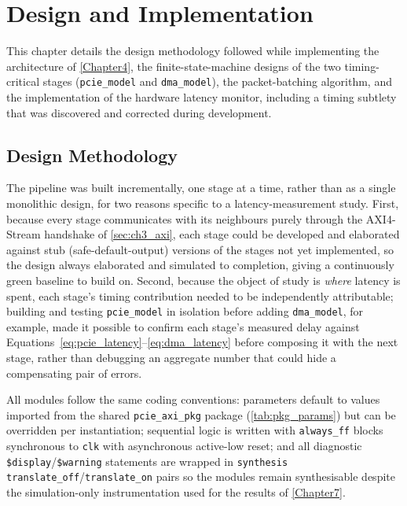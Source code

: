 
\chapter{Design and Implementation}

\label{Chapter5}


This chapter details the design methodology followed while implementing the architecture of \autoref{Chapter4}, the finite-state-machine designs of the two timing-critical stages (\texttt{pcie\_model} and \texttt{dma\_model}), the packet-batching algorithm, and the implementation of the hardware latency monitor, including a timing subtlety that was discovered and corrected during development.


\section{Design Methodology}
\label{sec:ch5_methodology}

The pipeline was built incrementally, one stage at a time, rather than as a single monolithic design, for two reasons specific to a latency-measurement study. First, because every stage communicates with its neighbours purely through the AXI4-Stream handshake of \autoref{sec:ch3_axi}, each stage could be developed and elaborated against stub (safe-default-output) versions of the stages not yet implemented, so the design always elaborated and simulated to completion, giving a continuously green baseline to build on. Second, because the object of study is \emph{where} latency is spent, each stage's timing contribution needed to be independently attributable; building and testing \texttt{pcie\_model} in isolation before adding \texttt{dma\_model}, for example, made it possible to confirm each stage's measured delay against Equations~\ref{eq:pcie_latency}--\ref{eq:dma_latency} before composing it with the next stage, rather than debugging an aggregate number that could hide a compensating pair of errors.

All modules follow the same coding conventions: parameters default to values imported from the shared \texttt{pcie\_axi\_pkg} package (\autoref{tab:pkg_params}) but can be overridden per instantiation; sequential logic is written with \texttt{always\_ff} blocks synchronous to \texttt{clk} with asynchronous active-low reset; and all diagnostic \texttt{\$display}/\texttt{\$warning} statements are wrapped in \texttt{synthesis translate\_off}/\texttt{translate\_on} pairs so the modules remain synthesisable despite the simulation-only instrumentation used for the results of \autoref{Chapter7}.

